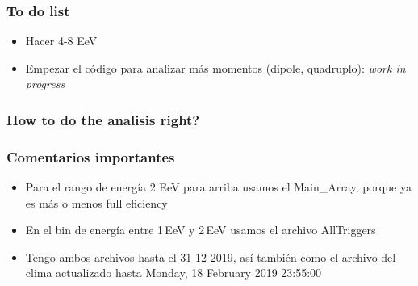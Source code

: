 \subsubsection*{To do list }
\begin{itemize}
  \item Hacer 4-8 EeV
  \item Empezar el código para analizar más momentos (dipole, quadruplo): {\sl work in progress}
\end{itemize}



\subsubsection*{How to do the analisis right?}


\subsubsection*{Comentarios importantes}

\begin{itemize}
  \item Para el rango de energía 2 EeV para arriba usamos el  Main\_Array, porque ya es más o menos full eficiency
  \item En el bin de energía entre 1\,EeV y 2\,EeV usamos el archivo AllTriggers
  \item Tengo ambos archivos hasta el 31 12 2019, así también como el archivo del clima actualizado hasta  Monday, 18 February 2019 23:55:00
\end{itemize}



